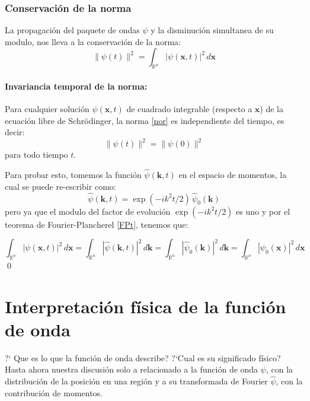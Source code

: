 \documentclass[12pt]{book}
\numberwithin{equation}{chapter}
\def\R{\mathbb{R}}
\def\x{\mathbf{x}}
\def\k{\mathbf{k}}
\begin{document}
\subsubsection{Conservaci\'on de la norma}

La propagaci\'on del paquete de ondas $\psi$ y la disminuci\'on simultanea de su modulo, nos lleva a la conservaci\'on de la norma:
\begin{equation}\label{nor}
\| \psi(t) \|^{2}= \int_{\R^{n}} |\psi(\x,t)|^{2} \, d\x
\end{equation}

\paragraph{Invariancia temporal de la norma:} Para cualquier soluci\'on $\psi (\x,t)$ de cuadrado integrable (respecto a $\x$) de la ecuaci\'on libre de Schr\"odinger, la norma \eqref{nor} es independiente del tiempo, es decir:
\begin{equation}
\| \psi(t) \|^{2}= \| \psi(0) \|^{2}
\end{equation}
para todo tiempo $t$.
\rightline{$\dag$}
\vspace{5 mm}

Para probar esto, tomemos la funci\'on $\hat{\psi}(\k,t)$ en el espacio de momentos, la cual se puede re-escribir como:
$$ \hat{\psi}(\k,t) = \exp ( -ik^{2}t/2 )\, \hat{\psi}_{0}(\k) $$
pero ya que el modulo del factor de evoluci\'on $\exp ( -ik^{2}t/2 )$ es uno y por el teorema de Fourier-Plancherel \ref{FPt}, tenemos que: 

$$ \int_{\R^{n}} |\psi(\x,t)|^{2} \, d\x = \int_{\R^{n}} |\hat{\psi}(\k,t)|^{2} \, d\k = \int_{\R^{n}} |\hat{\psi}_{0}(\k)|^{2} \, d\k= \int_{\R^{n}} |\psi_{0}(\x)|^{2} \, d\x$$
\qed

\section{Interpretaci\'on f\'isica de la funci\'on de onda}
?` Que es lo que la funci\'on de onda describe? ?`Cual es su significado f\'isico? Hasta ahora nuestra discusi\'on solo a relacionado a la funci\'on de onda $\psi$, con la distribuci\'on de la posici\'on en una regi\'on y a su transformada de Fourier $\hat{\psi}$, con la contribuci\'on de momentos.\\
\end{document}

